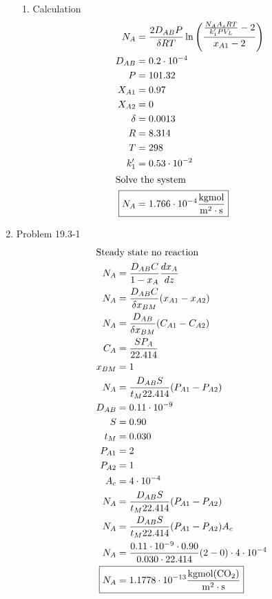 \documentclass[12pt]{article}
\begin{document}
\begin{enumerate}
\begin{enumerate}
        \item Calculation
        \begin{align*}
            N_A &= \frac{2 D_{AB} P}{\delta R T} \ln\left( \frac{\frac{N_A A_s RT}{k_1' P V_L} - 2}{x_{A1} - 2} \right) \\
            D_{AB} &= 0.2 \cdot 10^{-4} \\
            P &= 101.32 \\
            X_{A1} &= 0.97 \\
            X_{A2} &= 0 \\
            \delta &= 0.0013 \\
            R &= 8.314 \\
            T &= 298 \\
            k_1' &= 0.53 \cdot 10^{-2} \\
            \intertext{Solve the system}
            \Aboxed{N_A &= 1.766 \cdot 10^{-4}\mathrm{\frac{kgmol}{m^2 \cdot s}}}
        \end{align*}
    \end{enumerate}


\newpage
    \item Problem 19.3-1
    \begin{align*}
        \intertext{Steady state no reaction}
        N_A &= \frac{D_{AB} C}{1 - x_A} \frac{dx_A}{dz} \\
        N_A &= \frac{D_{AB} C}{\delta x_{BM}} (x_{A1} - x_{A2}) \\
        N_A &= \frac{D_{AB}}{\delta x_{BM}} (C_{A1} - C_{A2}) \\
        C_A &= \frac{S P_A}{22.414} \\
        x_{BM} &= 1 \\
        N_A &= \frac{D_{AB} S}{t_M 22.414} (P_{A1} - P_{A2}) \\
        D_{AB} &= 0.11 \cdot 10^{-9} \\
        S &= 0.90 \\
        t_M &= 0.030 \\
        P_{A1} &= 2 \\
        P_{A2} &= 1 \\
        A_c &= 4 \cdot 10^{-4} \\
        N_A &= \frac{D_{AB} S}{t_M 22.414} (P_{A1} - P_{A2}) \\
        N_A &= \frac{D_{AB} S}{t_M 22.414} (P_{A1} - P_{A2}) A_c \\
        N_A &= \frac{0.11 \cdot 10^{-9} \cdot 0.90}{0.030 \cdot 22.414} (2 - 0) \cdot 4 \cdot 10^{-4} \\
        \Aboxed{N_A &= 1.1778 \cdot 10^{-13}\mathrm{\frac{kgmol(CO_2)}{m^2 \cdot s}}}
    \end{align*}


\end{enumerate}
\end{document}
